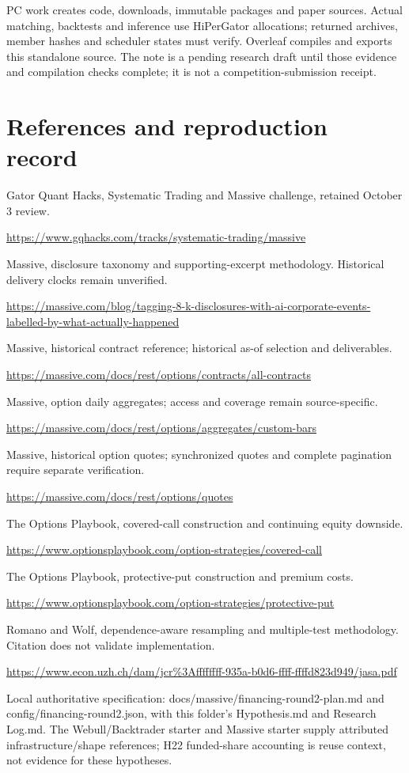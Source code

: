 \documentclass[11pt,letterpaper]{article}
\begin{document}
PC work creates code, downloads, immutable packages and paper sources. Actual matching, backtests and inference use HiPerGator allocations; returned archives, member hashes and scheduler states must verify. Overleaf compiles and exports this standalone source. The note is a pending research draft until those evidence and compilation checks complete; it is not a competition-submission receipt.


\label{mainend}
\clearpage
\section*{References and reproduction record}
Gator Quant Hacks, Systematic Trading and Massive challenge, retained October 3 review.\par\url{https://www.gqhacks.com/tracks/systematic-trading/massive}\par\medskip
Massive, disclosure taxonomy and supporting-excerpt methodology. Historical delivery clocks remain unverified.\par\url{https://massive.com/blog/tagging-8-k-disclosures-with-ai-corporate-events-labelled-by-what-actually-happened}\par\medskip
Massive, historical contract reference; historical as-of selection and deliverables.\par\url{https://massive.com/docs/rest/options/contracts/all-contracts}\par\medskip
Massive, option daily aggregates; access and coverage remain source-specific.\par\url{https://massive.com/docs/rest/options/aggregates/custom-bars}\par\medskip
Massive, historical option quotes; synchronized quotes and complete pagination require separate verification.\par\url{https://massive.com/docs/rest/options/quotes}\par\medskip
The Options Playbook, covered-call construction and continuing equity downside.\par\url{https://www.optionsplaybook.com/option-strategies/covered-call}\par\medskip
The Options Playbook, protective-put construction and premium costs.\par\url{https://www.optionsplaybook.com/option-strategies/protective-put}\par\medskip
Romano and Wolf, dependence-aware resampling and multiple-test methodology. Citation does not validate implementation.\par\url{https://www.econ.uzh.ch/dam/jcr%3Affffffff-935a-b0d6-ffff-ffffd823d949/jasa.pdf}\par\medskip
Local authoritative specification: docs/massive/financing-round2-plan.md and config/financing-round2.json, with this folder's Hypothesis.md and Research Log.md. The Webull/Backtrader starter and Massive starter supply attributed infrastructure/shape references; H22 funded-share accounting is reuse context, not evidence for these hypotheses.
\end{document}
